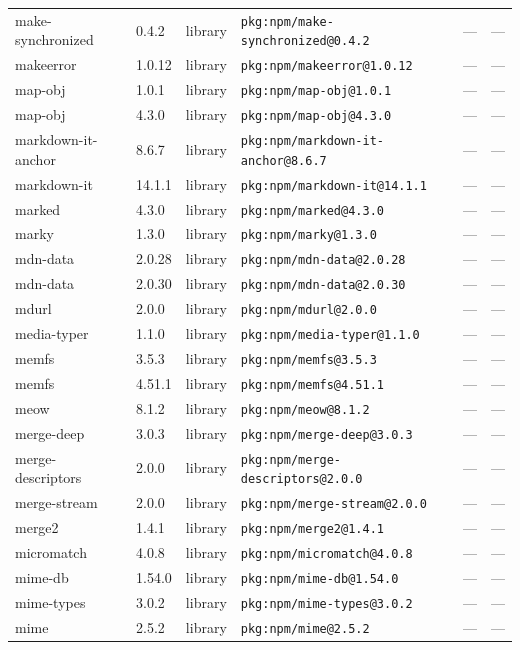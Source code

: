 \documentclass[11pt]{article}
\begin{document}
\begin{longtable}{|l|l|l|p{2.2cm}|l|p{4cm}|}
make-synchronized & 0.4.2 & library & \texttt{pkg:npm/make-synchronized@0.4.2} & — & — \\
makeerror & 1.0.12 & library & \texttt{pkg:npm/makeerror@1.0.12} & — & — \\
map-obj & 1.0.1 & library & \texttt{pkg:npm/map-obj@1.0.1} & — & — \\
map-obj & 4.3.0 & library & \texttt{pkg:npm/map-obj@4.3.0} & — & — \\
markdown-it-anchor & 8.6.7 & library & \texttt{pkg:npm/markdown-it-anchor@8.6.7} & — & — \\
markdown-it & 14.1.1 & library & \texttt{pkg:npm/markdown-it@14.1.1} & — & — \\
marked & 4.3.0 & library & \texttt{pkg:npm/marked@4.3.0} & — & — \\
marky & 1.3.0 & library & \texttt{pkg:npm/marky@1.3.0} & — & — \\
mdn-data & 2.0.28 & library & \texttt{pkg:npm/mdn-data@2.0.28} & — & — \\
mdn-data & 2.0.30 & library & \texttt{pkg:npm/mdn-data@2.0.30} & — & — \\
mdurl & 2.0.0 & library & \texttt{pkg:npm/mdurl@2.0.0} & — & — \\
media-typer & 1.1.0 & library & \texttt{pkg:npm/media-typer@1.1.0} & — & — \\
memfs & 3.5.3 & library & \texttt{pkg:npm/memfs@3.5.3} & — & — \\
memfs & 4.51.1 & library & \texttt{pkg:npm/memfs@4.51.1} & — & — \\
meow & 8.1.2 & library & \texttt{pkg:npm/meow@8.1.2} & — & — \\
merge-deep & 3.0.3 & library & \texttt{pkg:npm/merge-deep@3.0.3} & — & — \\
merge-descriptors & 2.0.0 & library & \texttt{pkg:npm/merge-descriptors@2.0.0} & — & — \\
merge-stream & 2.0.0 & library & \texttt{pkg:npm/merge-stream@2.0.0} & — & — \\
merge2 & 1.4.1 & library & \texttt{pkg:npm/merge2@1.4.1} & — & — \\
micromatch & 4.0.8 & library & \texttt{pkg:npm/micromatch@4.0.8} & — & — \\
mime-db & 1.54.0 & library & \texttt{pkg:npm/mime-db@1.54.0} & — & — \\
mime-types & 3.0.2 & library & \texttt{pkg:npm/mime-types@3.0.2} & — & — \\
mime & 2.5.2 & library & \texttt{pkg:npm/mime@2.5.2} & — & — \\

\end{longtable}
\end{document}
